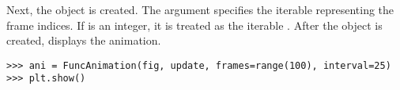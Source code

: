 \begin{comment}
Three main objects are required for animating plots in Matplotlib.
First, you need to create a figure object as explained above.
Then you need to create a \li{matplotlib.lines.Line2D} or \li{matplotlib.lines.Line3D} object (depending on the dimension of the graph you are animating).
The following code shows one way to initialize a \li{Line2D} object:

\begin{lstlisting}
>>> line, = plt.plot([],[])
\end{lstlisting}

As explained above, \li{plt.plot()} returns a list.
Thus setting the output equal to \li{line,} is equivalent to setting the variable named \li{line} to the first element of the returned list.
Accessing the zero index of the list would yield the equivalent result, but it is conventional to use the trailing comma.

One figure and line objects have been initialized, an update function needs to be defined and a \li{FuncAnimation} object created.
The \li{FuncAnimation} constructor takes in the figure and the update function as inputs.
It calls the update function at each frame of the animation. 

The update function must take the time frame index as its first parameter.
The \li{Line2D} and \li{Line3D} objects have the built in function call \li{set_data()}.
This function takes in 2 1D arrays representing x and y values (or a 2xn array with x and y values). Inside the update function, the \li{set_data()} function is called on the line objects using the frame index to specify the data.
Then the line object is returned, as shown below:

\begin{lstlisting}
>>> def update(i):
>>>     line.set_data(x, y[i])
>>>     return line,
\end{lstlisting}
\end{comment}

Next, the  object is created.
The argument  specifies the iterable representing the frame indices.
If  is an integer, it is treated as the iterable .
After the  object is created,  displays the animation.

\begin{lstlisting}
>>> ani = FuncAnimation(fig, update, frames=range(100), interval=25)
>>> plt.show()
\end{lstlisting}

